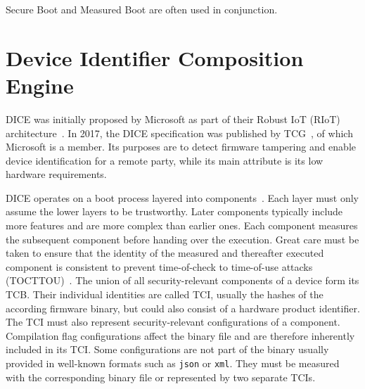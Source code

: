 Secure Boot and Measured Boot are often used in conjunction.

\section{Device Identifier Composition Engine}

\Ac{DICE} was initially proposed by Microsoft as part of their Robust IoT (RIoT) architecture~\cite{England2016}.
In 2017, the DICE specification was published by \ac{TCG}~\cite{tcg-microsoft-tpm}, of which Microsoft is a member.
Its purposes are to detect firmware tampering and enable device identification for a remote party, while its main attribute is its low hardware requirements.


DICE operates on a boot process layered into components~\cite{dice-layering-arch}.
Each layer must only assume the lower layers to be trustworthy.
Later components typically include more features and are more complex than earlier ones.
Each component measures the subsequent component before handing over the execution.
Great care must be taken to ensure that the identity of the measured and thereafter executed component is consistent to prevent time-of-check to time-of-use attacks (TOCTTOU)~\cite{Hristozov2022, Carpent2018}.
The union of all security-relevant components of a device form its \ac{TCB}.
Their individual identities are called \ac{TCI}, usually the hashes of the according firmware binary, but could also consist of a hardware product identifier.
The TCI must also represent security-relevant configurations of a component.
Compilation flag configurations affect the binary file and are therefore inherently included in its TCI\@.
Some configurations are not part of the binary usually provided in well-known formats such as \texttt{json} or \texttt{xml}.
They must be measured with the corresponding binary file or represented by two separate \acp{TCI}.


